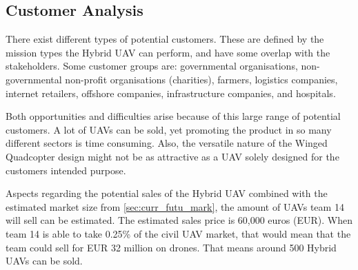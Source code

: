 \addtocounter{footnote}{-9}





\subsection{Customer Analysis}
There exist different types of potential customers. These are defined by the mission types the Hybrid UAV can perform, and have some overlap with the stakeholders. Some customer groups are: governmental organisations, non-governmental non-profit organisations (charities), farmers, logistics companies, internet retailers, offshore companies, infrastructure companies, and hospitals. 


Both opportunities and difficulties arise because of this large range of potential customers. A lot of UAVs can be sold, yet promoting the product in so many different sectors is time consuming. Also, the versatile nature of the Winged Quadcopter design might not be as attractive as a UAV solely designed for the customers intended purpose.


Aspects regarding the potential sales of the Hybrid UAV combined with the estimated market size from \autoref{sec:curr_futu_mark}, the amount of UAVs team 14 will sell can be estimated. The estimated sales price is 60,000 euros (EUR). When team 14 is able to take 0.25\% of the civil UAV market, that would mean that the team could sell for EUR 32 million on drones\footnotemark. That means around 500 Hybrid UAVs can be sold.


